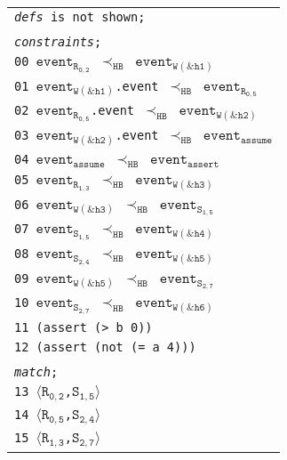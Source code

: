 \newsavebox{\boxSMTb}
\begin{lrbox}{\boxSMTb}
\normalsize
\begin{tabular}[c]{l}
\texttt{\textit{defs} is not shown;}\\
\\
\texttt{\textit{constraints};}\\
\texttt{00 $\mathtt{event_{R_{0,2}}}$ $\mathtt{\prec_\mathtt{HB}}$ $\mathtt{event_{W(\&h1)}}$}\\
\texttt{01 $\mathtt{event_{W(\&h1)}}$.event $\mathtt{\prec_\mathtt{HB}}$ $\mathtt{event_{R_{0,5}}}$}\\
\texttt{02 $\mathtt{event_{R_{0,5}}}$.event $\mathtt{\prec_\mathtt{HB}}$ $\mathtt{event_{W(\&h2)}}$}\\
\texttt{03 $\mathtt{event_{W(\&h2)}}$.event $\mathtt{\prec_\mathtt{HB}}$ $\mathtt{event_{assume}}$}\\
\texttt{04 $\mathtt{event_{assume}}$ $\mathtt{\prec_\mathtt{HB}}$ $\mathtt{event_{assert}}$}\\
\texttt{05 $\mathtt{event_{R_{1,3}}}$ $\mathtt{\prec_\mathtt{HB}}$ $\mathtt{event_{W(\&h3)}}$}\\
\texttt{06 $\mathtt{event_{W(\&h3)}}$ $\mathtt{\prec_\mathtt{HB}}$ $\mathtt{event_{S_{1,5}}}$}\\
\texttt{07 $\mathtt{event_{S_{1,5}}}$ $\mathtt{\prec_\mathtt{HB}}$ $\mathtt{event_{W(\&h4)}}$}\\
\texttt{08 $\mathtt{event_{S_{2,4}}}$ $\mathtt{\prec_\mathtt{HB}}$ $\mathtt{event_{W(\&h5)}}$}\\
\texttt{09 $\mathtt{event_{W(\&h5)}}$ $\mathtt{\prec_\mathtt{HB}}$ $\mathtt{event_{S_{2,7}}}$}\\
\texttt{10 $\mathtt{event_{S_{2,7}}}$ $\mathtt{\prec_\mathtt{HB}}$ $\mathtt{event_{W(\&h6)}}$}\\
\texttt{11 (assert (> b 0))}\\
\texttt{12 (assert (not (= a 4)))}\\
\\
\texttt{\textit{match};}\\
\texttt{13 $\langle\mathtt{R_{0,2}}$,$\mathtt{S_{1,5}}\rangle$}\\
\texttt{14 $\langle\mathtt{R_{0,5}}$,$\mathtt{S_{2,4}}\rangle$}\\
\texttt{15 $\langle\mathtt{R_{1,3}}$,$\mathtt{S_{2,7}}\rangle$}\\

\end{tabular}
\end{lrbox}

